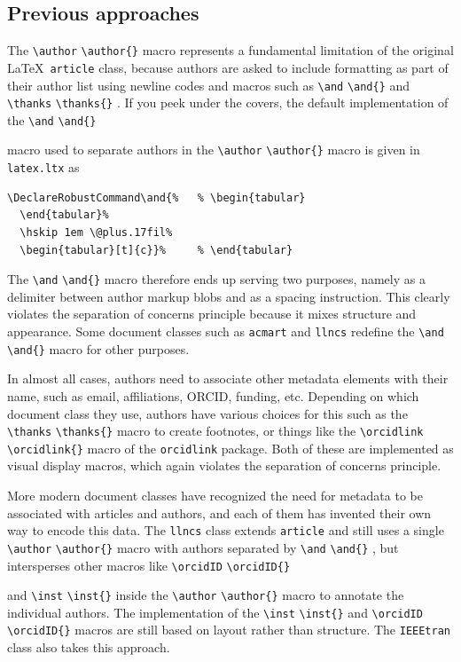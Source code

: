 \documentclass{article}
\newcommand{\cmd}[2][]{%
  \def\FirstArg{#1}%
  \ifx\FirstArg\empty%
    \texttt{\textbackslash{}#2}%
  \else%
    \texttt{\textbackslash{}#2\{#1\}}%
  \fi
}
\newcommand{\pkg}[1]{\texttt{#1}}
\begin{document}
\subsection{Previous approaches}
The \cmd{author} macro represents a fundamental limitation of the
original \LaTeX\ \pkg{article} class, because authors are asked to include
formatting as part of their author list using newline codes and
macros such as \cmd{and} and \cmd{thanks}.
If you peek under the covers, the default implementation of the \cmd{and}
macro used to separate authors in the \cmd{author} macro
is given in \texttt{latex.ltx} as
\begin{Verbatim}[samepage=true]
\DeclareRobustCommand\and{%   % \begin{tabular}
  \end{tabular}%
  \hskip 1em \@plus.17fil%
  \begin{tabular}[t]{c}}%     % \end{tabular}
\end{Verbatim}
 The
\cmd{and} macro therefore ends up serving two purposes, namely as a delimiter
between author markup blobs and as a spacing instruction. This clearly
violates the separation of concerns principle because it mixes
structure and appearance. Some document classes such as \texttt{acmart} and
\texttt{llncs} redefine the \cmd{and} macro for other purposes.

In almost all cases, authors need to associate other metadata elements with their
name, such as email, affiliations, ORCID, funding, etc. Depending on which document
class they use, authors have various choices
for this such as the \cmd{thanks} macro to create footnotes, or things
like the \cmd{orcidlink} macro of the \texttt{orcidlink} package. Both of these
are implemented as visual display macros, which again violates the separation
of concerns principle.

More modern document classes
have recognized the need for metadata to be associated with articles
and authors, and each of them has invented their own way to encode
this data.  The \pkg{llncs} class extends \pkg{article} and still uses a
single \cmd{author} macro with authors separated by \cmd{and},
but intersperses other macros like \cmd{orcidID}
and \cmd{inst} inside the \cmd{author} macro to annotate the
individual authors. The implementation of the \cmd{inst} and
\cmd{orcidID} macros are still based on layout rather than structure.
The \pkg{IEEEtran} class also takes this approach.
\end{document}
